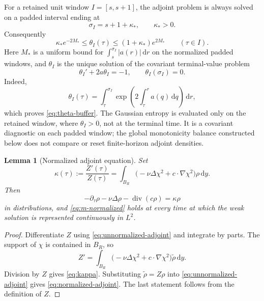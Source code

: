 \documentclass[11pt]{amsart}
\numberwithin{equation}{section}
\theoremstyle{plain}
\newtheorem{lemma}[lemma]{Lemma}
\theoremstyle{definition}
\theoremstyle{remark}
\newcommand{\dd}{\,\mathrm d}
\newcommand{\diver}{\operatorname{div}}
\begin{document}
For a retained unit window \(I=[s,s+1]\), the adjoint problem is always
solved on a padded interval ending at
\begin{equation}\label{eq:adjoint-buffer}
 \sigma_I=s+1+\kappa_*,
 \qquad \kappa_*>0.
\end{equation}
Consequently
\begin{equation}\label{eq:theta-buffer}
 \kappa_*e^{-2M_*}\le\theta_I(\tau)
 \le(1+\kappa_*)e^{2M_*}
 \qquad(\tau\in I).
\end{equation}
Here \(M_*\) is a uniform bound for
\(\int_s^{\sigma_I}|a(r)|\dd r\) on the normalized padded windows, and
\(\theta_I\) is the unique solution of the covariant terminal-value problem
\begin{equation}\label{eq:covariant-heat-scale}
 \theta_I'+2a\theta_I=-1,
 \qquad \theta_I(\sigma_I)=0.
\end{equation}
Indeed,
\begin{equation}\label{eq:covariant-heat-scale-formula}
 \theta_I(\tau)
 =\int_\tau^{\sigma_I}
   \exp\!\left(2\int_\tau^r a(q)\dd q\right)\dd r,
\end{equation}
which proves \eqref{eq:theta-buffer}.  The Gaussian entropy is evaluated only
on the retained window, where \(\theta_I>0\), not at the terminal time.  It is
a covariant diagnostic on each padded window; the global monotonicity balance
constructed below does not compare or reset finite-horizon adjoint densities.

\begin{lemma}[Normalized adjoint equation]
\label{lem:normalized-adjoint}
Set
\begin{equation}\label{eq:kappa}
 \kappa(\tau):=\frac{Z'(\tau)}{Z(\tau)}
 =\int_{B_R}
 \bigl(-\nu\Delta\chi^2+c\cdot\nabla\chi^2\bigr)\rho\dd y.
\end{equation}
Then
\begin{equation}\label{eq:normalized-adjoint}
 -\partial_\tau\rho-\nu\Delta\rho-\diver(c\rho)
 =\kappa\rho
\end{equation}
in distributions, and \eqref{eq:m-normalized} holds at every time at which
the weak solution is represented continuously in \(L^2\).
\end{lemma}

\begin{proof}
Differentiate \(Z\) using \eqref{eq:unnormalized-adjoint} and integrate by
parts.  The support of \(\chi\) is contained in \(B_R\), so
\[
 Z'=\int_{B_R}
 \bigl(-\nu\Delta\chi^2+c\cdot\nabla\chi^2\bigr)
 \widetilde\rho\dd y.
\]
Division by \(Z\) gives \eqref{eq:kappa}.  Substituting
\(\widetilde\rho=Z\rho\) into
\eqref{eq:unnormalized-adjoint} gives
\eqref{eq:normalized-adjoint}.  The last statement follows from the
definition of \(Z\).
\end{proof}
\end{document}
